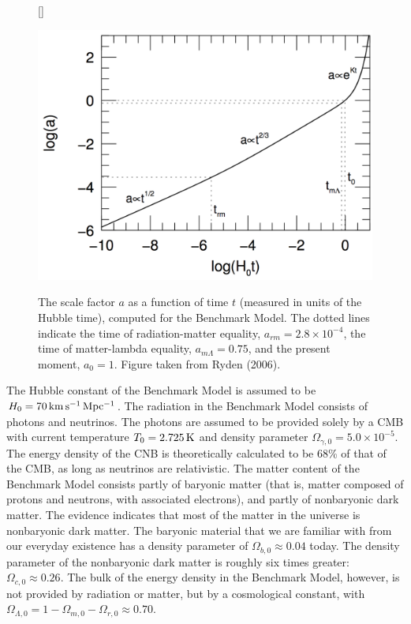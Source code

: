 \documentclass[a4paper,11pt]{article}
\begin{document}
\begin{figure}[t]
    [\FBwidth]
    {\caption{\footnotesize{The scale factor $a$ as a function of time $t$ (measured in units of the Hubble time), computed for the Benchmark Model. The dotted lines indicate the time of radiation-matter equality, $a_{rm}=2.8\times10^{-4}$, the time of matter-lambda equality, $a_{m\Lambda}=0.75$, and the present moment, $a_0=1$. Figure taken from Ryden (2006).}}
    \label{fig:avst}}
    {\includegraphics[width=12cm]{figures/avst.png}}
\end{figure}

{\noindent}The Hubble constant of the Benchmark Model is assumed to be $H_0=70\,{\rm km\,s^{-1}\,Mpc^{-1}}$. The radiation in the Benchmark Model consists of photons and neutrinos. The photons are assumed to be provided solely by a CMB with current temperature $T_0=2.725\,{\rm K}$ and density parameter $\Omega_{\gamma,0}=5.0\times10^{-5}$. The energy density of the CNB is theoretically calculated to be 68\% of that of the CMB, as long as neutrinos are relativistic. The matter content of the Benchmark Model consists partly of baryonic matter (that is, matter composed of protons and neutrons, with associated electrons), and partly of nonbaryonic dark matter. The evidence indicates that most of the matter in the universe is nonbaryonic dark matter. The baryonic material that we are familiar with from our everyday existence has a density parameter of $\Omega_{b,0}\approx0.04$ today. The density parameter of the nonbaryonic dark matter is roughly six times greater: $\Omega_{c,0}\approx0.26$. The bulk of the energy density in the Benchmark Model, however, is not provided by radiation or matter, but by a cosmological constant, with $\Omega_{\Lambda,0}=1-\Omega_{m,0}-\Omega_{r,0}\approx0.70$.
\end{document}

